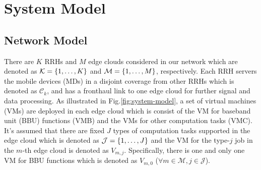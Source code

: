 \section{System Model}
\label{sec:model}

\subsection{Network Model}
There are $K$ RRHs and $M$ edge clouds considered in our network which are denoted as $\mathcal{K}=\{1,\dots,K\}$ and $\mathcal{M}=\{1,\dots,M\}$, respectively.
Each RRH servers the mobile devices (MDs) in a disjoint coverage from other RRHs which is denoted as $\mathcal{C}_{k}$, and has a fronthaul link to one edge cloud for further signal and data processing.
As illustrated in Fig.\ref{fig:system-model}, a set of virtual machines (VMs) are deployed in each edge cloud which is consist of the VM for baseband unit (BBU) functions (VMB) and the VMs for other computation tasks (VMC).
It's assumed that there are fixed $J$ types of computation tasks supported in the edge cloud which is denoted as $\mathcal{J}=\{1,\dots,J\}$ and the VM for the type-$j$ job in the $m$-th edge cloud is denoted as $V_{m,j}$.
Specifically, there is one and only one VM for BBU functions which is denoted as $V_{m,0}$ ($\forall m\in\mathcal{M},j\in\mathcal{J}$).

